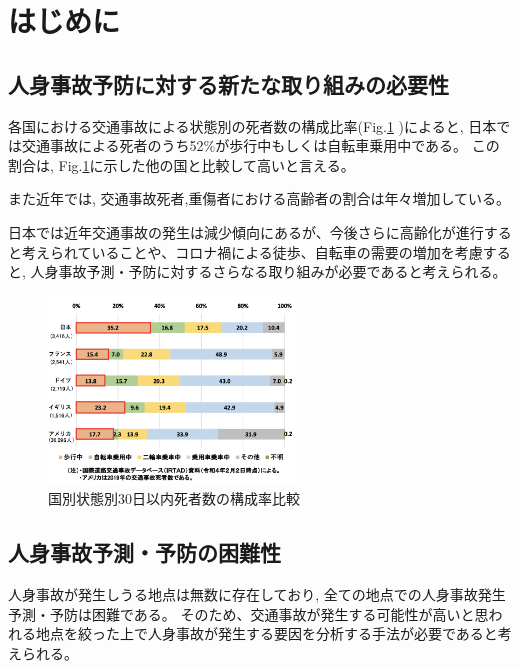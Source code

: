 \documentclass[a4j,8.5pt, twocolumn,fleqn]{jbook}
\begin{document}
\Atitle
\small
\vspace*{-2mm}


\section{はじめに}
\subsection{人身事故予防に対する新たな取り組みの必要性}
各国における交通事故による状態別の死者数の構成比率(Fig.\ref{国別状態別30日以内死者数の構成率比較}
)によると, 日本では交通事故による死者のうち52\%が歩行中もしくは自転車乗用中である。
この割合は, Fig.\ref{国別状態別30日以内死者数の構成率比較}に示した他の国と比較して高いと言える。

また近年では, 交通事故死者,重傷者における高齢者の割合は年々増加している\cite{令和3年における交通事故の発生状況等について}。

日本では近年交通事故の発生は減少傾向にあるが、今後さらに高齢化が進行すると考えられていることや、コロナ禍による徒歩、自転車の需要の増加\cite{自転車を巡る現状等}を考慮すると, 人身事故予測・予防に対するさらなる取り組みが必要であると考えられる。

\begin{figure}[htb]
    \centering
    \includegraphics[height=50mm]{images/shibou_status.png}
    \vspace{-4mm}
    \caption{国別状態別30日以内死者数の構成率比較\cite{令和3年における交通事故の発生状況等について}}
    \label{国別状態別30日以内死者数の構成率比較}
\end{figure}

\subsection{人身事故予測・予防の困難性}
人身事故が発生しうる地点は無数に存在しており, 全ての地点での人身事故発生予測・予防は困難である。
そのため、交通事故が発生する可能性が高いと思われる地点を絞った上で人身事故が発生する要因を分析する手法が必要であると考えられる。
\end{document}
